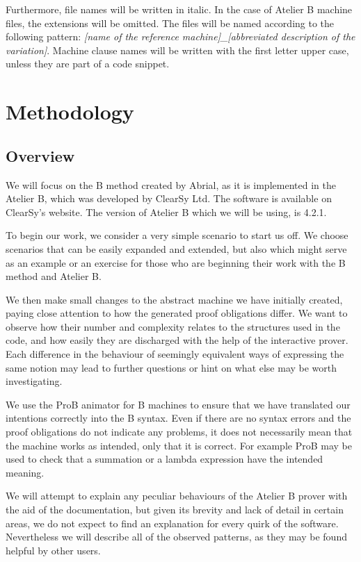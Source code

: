 \documentclass[12pt,journal,duplex]{IEEEtran}
\begin{document}
	Furthermore, file names will be written in italic. In the case of Atelier B machine files, the extensions will be omitted. The files will be named according to the following pattern: \emph{[name of the reference machine]\_[abbreviated description of the variation]}. Machine clause names will be written with the first letter upper case, unless they are part of a code snippet.

	\section{Methodology}
	\subsection{Overview}
	We will focus on the B method created by Abrial, as it is implemented in the Atelier B, which was developed by ClearSy Ltd. The software is available on ClearSy's website. The version of Atelier B which we will be using, is 4.2.1.

	To begin our work, we consider a very simple scenario to start us off. We choose scenarios that can be easily expanded and extended, but also which might serve as an example or an exercise for those who are beginning their work with the B method and Atelier B.

	We then make small changes to the abstract machine we have initially created, paying close attention to how the generated proof obligations differ. We want to observe how their number and complexity relates to the structures used in the code, and how easily they are discharged with the help of the interactive prover. Each difference in the behaviour of seemingly equivalent ways of expressing the same notion may lead to further questions or hint on what else may be worth investigating.

	We use the ProB animator for B machines to ensure that we have translated our intentions correctly into the B syntax. Even if there are no syntax errors and the proof obligations do not indicate any problems, it does not necessarily mean that the machine works as intended, only that it is correct. For example ProB may be used to check that a summation or a lambda expression have the intended meaning.

	We will attempt to explain any peculiar behaviours of the Atelier B prover with the aid of the documentation, but given its brevity and lack of detail in certain areas, we do not expect to find an explanation for every quirk of the software. Nevertheless we will describe all of the observed patterns, as they may be found helpful by other users.
\end{document}
